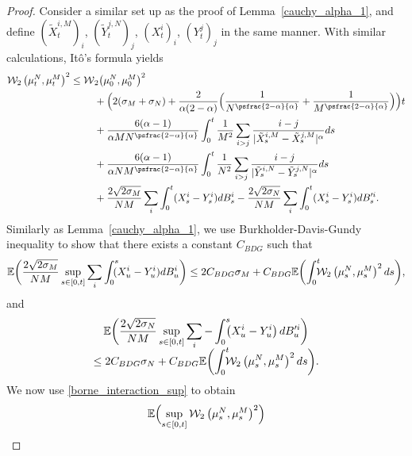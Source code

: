 \begin{proof}
Consider a similar set up as the proof of Lemma~\ref{cauchy_alpha_1}, and define $(\tilde{X}^{i,M}_t)_i$, $(\tilde{Y}^{j,N}_t)_j$, $(X^{i}_t)_i$, $(Y^{j}_t)_j$ in the same manner. With similar calculations, Itô's formula yields\vspace*{-5pt}
\begin{align*}
\mathcal{W}_2\left(\mu_t^N,\mu_t^M\right)^2\leq \mathcal{W}&_2\bigl(\mu_0^N,\mu_0^M\bigr)^2\\
&+\Bigl(2(\sigma_M+\sigma_N)+\frac{2}{\alpha(2-\alpha)}\Bigl(\frac{1}{N^{\psfrac{2-\alpha}{\alpha}}}+\frac{1}{M^{\psfrac{2-\alpha}{\alpha}}}\Bigr)\Bigr)t\\
&+\frac{6(\alpha-1)}{\alpha MN^{\psfrac{2-\alpha}{\alpha}}}\int_{0}^t\frac{1}{M^2}\sum_{i>j}\frac{i-j}{|\tilde{X}^{i,M}_s-\tilde{X}^{j,M}_s|^{\alpha}}ds\\
&+\frac{6(\alpha-1)}{\alpha NM^{\psfrac{2-\alpha}{\alpha}}}\int_{0}^t\frac{1}{N^2}\sum_{i>j}\frac{i-j}{|\tilde{Y}^{i,N}_s-\tilde{Y}^{j,N}_s|^{\alpha}}ds\\
&+\frac{2\sqrt{2\sigma_M}}{NM}\sum_i\int_0^t(X^i_s-Y^i_s)dB^i_s-\frac{2\sqrt{2\sigma_N}}{NM}\sum_i\int_0^t(X^i_s-Y^i_s)dB'^i_s.
\end{align*}
Similarly as Lemma~\ref{cauchy_alpha_1}, we use Burkholder-Davis-Gundy inequality to show that there exists a constant $C_{BDG}$ such that\vspace*{-3pt}
\[
\mathbb{E}\biggl(\frac{2\sqrt{2\sigma_M}}{NM}\sup_{s\in[0,t]}\sum_i\int_0^s\hspace*{-2mm}(X^i_u-Y^i_u)dB^{i}_u\biggr)\\
\leq2C_{BDG}\sigma_M+C_{BDG}\mathbb{E}\biggl(\int_0^t\hspace*{-2mm}\mathcal{W}_2\left(\mu_s^N,\mu_s^M\right)^2ds\biggr),
\]
and\vspace*{-5pt}
\begin{multline*}
\mathbb{E}\biggl(\frac{2\sqrt{2\sigma_N}}{NM}\sup_{s\in[0,t]}\sum_i-\int_0^s\hspace*{-2mm}\left(X^i_u-Y^i_u\right)dB'^{i}_u\biggr)\\[-5pt]
\leq2C_{BDG}\sigma_N+C_{BDG}\mathbb{E}\biggl(\int_0^t\hspace*{-2mm}\mathcal{W}_2\left(\mu_s^N,\mu_s^M\right)^2ds\biggr).
\end{multline*}
We now use \eqref{borne_interaction_sup} to obtain\vspace*{-3pt}
\begin{align*}
\mathbb{E}&\Bigl(\sup_{s\in[0,t]}\mathcal{W}_2\left(\mu_s^N,\mu_s^M\right)^2\Bigr)\\

\end{align*}
\end{proof}
